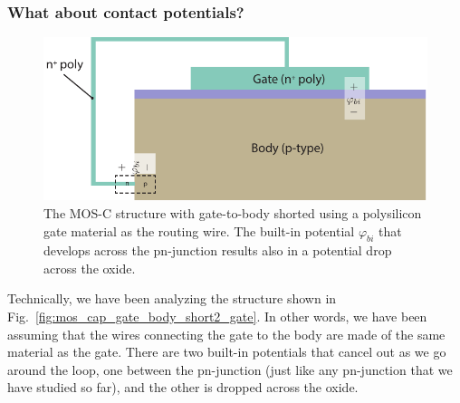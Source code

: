 \subsubsection{What about contact potentials?}
\begin{figure}[tbh]
\begin{center}
\includegraphics[width=.75\columnwidth]{mos_cap_short_phibi}
\end{center}
\caption{The MOS-C structure with gate-to-body shorted using a polysilicon gate material as the routing wire.  The built-in potential $\varphi_{bi}$ that develops across the pn-junction results also in a  potential drop across the oxide.}
\label{fig:mos_cap_gate_body_short_gate}
\end{figure}

Technically, we have been analyzing the structure shown in Fig.~\ref{fig:mos_cap_gate_body_short2_gate}.  In other words, we have been assuming that the wires connecting the gate to the body are made of the same material as the gate.  There are two built-in potentials that cancel out as we go around the loop, one between the pn-junction (just like any pn-junction that we have studied so far), and the other is dropped across the oxide.  
